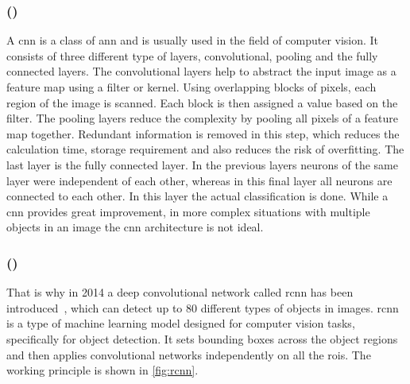 \subsubsection{ ()}
A \gls{cnn} is a class of \gls{ann} and is usually used in the field of computer vision.
It consists of three different type of layers, convolutional, pooling and the fully connected layers.
The convolutional layers help to abstract the input image as a feature map using a filter or kernel.
Using overlapping blocks of pixels, each region of the image is scanned.
Each block is then assigned a value based on the filter.
The pooling layers reduce the complexity by pooling all pixels of a feature map together.
Redundant information is removed in this step, which reduces the calculation time, storage requirement and also reduces the risk of overfitting.
The last layer is the fully connected layer.
In the previous layers neurons of the same layer were independent of each other, whereas in this final layer all neurons are connected to each other.
In this layer the actual classification is done.
While a \gls{cnn} provides great improvement, in more complex situations with multiple objects in an image the \gls{cnn} architecture is not ideal.

\subsubsection{ ()}
\label{sssec:rcnn}
That is why in 2014 a deep convolutional network called \gls{rcnn} has been introduced~\cite{Girshick2014}, which can detect up to 80 different types of objects in images.
\gls{rcnn} is a type of machine learning model designed for computer vision tasks, specifically for object detection.
It sets bounding boxes across the object regions and then applies convolutional networks independently on all the \glspl{roi}.
The working principle is shown in \cref{fig:rcnn}.

